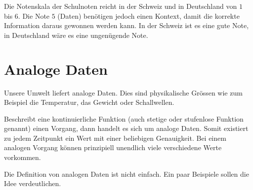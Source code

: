 \begin{example}
Die Notenskala der Schulnoten reicht in der Schweiz und in Deutschland von $1$ bis $6$. Die Note $5$ (Daten) benötigen jedoch einen Kontext, damit die korrekte Information daraus gewonnen werden kann. In der Schweiz ist es eine gute Note, in Deutschland wäre es eine ungenügende Note.
\end{example}

\section{Analoge Daten}

Unsere Umwelt liefert analoge Daten. Dies sind physikalische Grössen wie zum Beispiel die Temperatur, das Gewicht oder Schallwellen.

\begin{definition}
Beschreibt eine kontinuierliche Funktion (auch stetige oder stufenlose Funktion genannt) einen Vorgang, dann handelt es sich um analoge Daten. Somit existiert zu jedem Zeitpunkt ein Wert mit einer beliebigen Genauigkeit. Bei einem analogen Vorgang können prinzipiell unendlich viele verschiedene Werte vorkommen.
\end{definition}

Die Definition von analogen Daten ist nicht einfach. Ein paar Beispiele sollen die Idee verdeutlichen.

